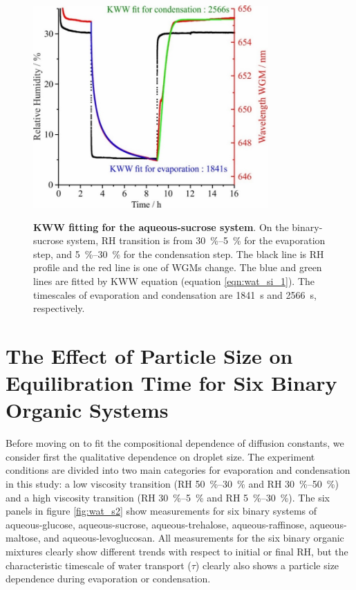 \begin{figure}
    \centering
    \caption{\textbf{KWW fitting for the aqueous-sucrose system}. On the binary-sucrose system, RH transition is from \SIrange{30}{5}{\percent} for the evaporation step, and \SIrange{5}{30}{\percent} for the condensation step. The black line is RH profile and the red line is one of WGMs change. The blue and green lines are fitted by KWW equation (equation \ref{eqn:wat_si_1}). The timescales of evaporation and condensation are \SI{1841}{\second} and \SI{2566}{\second}, respectively.}
    \includegraphics[width=0.8\textwidth]{chapters/water_hopping/figures/image003.jpg}
    \label{fig:wat_s1}
\end{figure}

\section{The Effect of Particle Size on Equilibration Time for Six Binary Organic Systems}
Before moving on to fit the compositional dependence of diffusion constants, we consider first the qualitative dependence on droplet size. The experiment conditions are divided into two main categories for evaporation and condensation in this study: a low viscosity transition (RH \SIrange{50}{30}{\percent} and RH \SIrange{30}{50}{\percent}) and a high viscosity transition (RH \SIrange{30}{5}{\percent} and RH \SIrange{5}{30}{\percent}). The six panels in figure \ref{fig:wat_s2} show measurements for six binary systems of aqueous-glucose, aqueous-sucrose, aqueous-trehalose, aqueous-raffinose, aqueous-maltose, and aqueous-levoglucosan. All measurements for the six binary organic mixtures clearly show different trends with respect to initial or final RH, but the characteristic timescale of water transport ($\tau$) clearly also shows a particle size dependence during evaporation or condensation.

